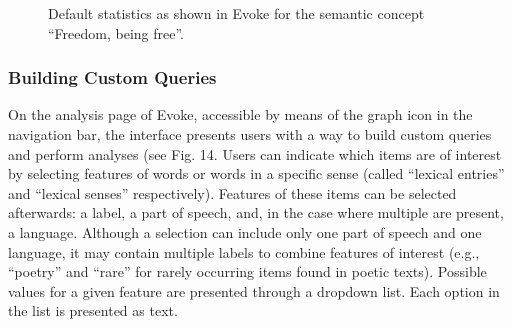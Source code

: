 \begin{figure}[htbp]
	\caption[]{\label{fig:Stolk2021a:Fig13} Default statistics as shown in Evoke for the semantic concept “Freedom, being free”.}
\end{figure}

\subsubsection{Building Custom Queries}
On the analysis page of Evoke, accessible by means of the graph icon in the navigation bar, the interface presents users with a way to build custom queries and perform analyses (see Fig. 14. Users can indicate which items are of interest by selecting features of words or words in a specific sense (called “lexical entries” and “lexical senses” respectively). Features of these items can be selected afterwards: a label, a part of speech, and, in the case where multiple are present, a language. Although a selection can include only one part of speech and one language, it may contain multiple labels to combine features of interest (e.g., “poetry” and “rare” for rarely occurring items found in poetic texts). Possible values for a given feature are presented through a dropdown list. Each option in the list is presented as text.  

